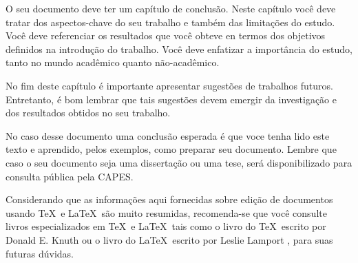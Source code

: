 
O seu documento deve ter um capítulo de conclusão. Neste capítulo você deve tratar dos aspectos-chave do seu trabalho e também das limitações do estudo. Você deve referenciar os resultados que você obteve en termos dos objetivos definidos na introdução do trabalho. Você deve enfatizar a importância do estudo, tanto no mundo acadêmico quanto não-acadêmico. 

No fim deste capítulo é importante apresentar sugestões de trabalhos futuros. Entretanto, é bom lembrar que tais sugestões devem emergir da investigação e dos resultados obtidos no seu trabalho.

No caso desse documento uma conclusão esperada é que voce tenha lido este texto e aprendido, pelos exemplos, como preparar seu documento. Lembre que caso o seu documento seja uma dissertação ou uma tese, será disponibilizado para consulta pública pela CAPES. 

Considerando que as informações aqui fornecidas sobre edição de documentos usando \TeX \ e \LaTeX \ são muito resumidas, recomenda-se que você consulte livros especializados em \TeX \ e \LaTeX \ tais como o livro do \TeX \ escrito por Donald E. Knuth \cite{texbook} ou o livro do \LaTeX \ escrito por Leslie Lamport \cite{latexbook}, para suas futuras dúvidas.
